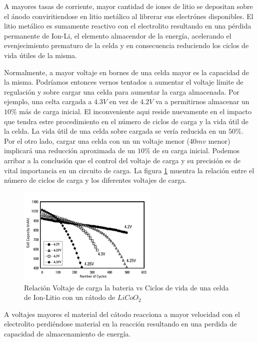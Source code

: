 \documentclass[10pt,a4paper]{article}
\begin{document}
A mayores tasas de corriente, mayor cantidad de iones de litio se depositan sobre
el ánodo conviritiendose en litio metálico al librerar sus electrónes disponibles.
El litio metálico es sumamente reactivo con el electrolito resultando en una
pérdida permanente de \acrshort{Ion-Li}, el elemento almacendor de la
energía, acelerando el evenjecimiento prematuro de
la celda y en consecuencia reduciendo los ciclos de vida útiles de la misma. 

Normalmente, a mayor voltaje en bornes de una celda mayor es la capacidad de la
misma. Podríamos entonces vernos tentados a aumentar el voltaje límite de
regulación y sobre cargar una celda para aumentar la carga almacenada. Por
ejemplo, una celta cargada a $4.3V$ en vez de $4.2V$ va a permitirnos almacenar
un $10\%$ más de carga inicial. El inconveniente aqui reside nuevamente en el
impacto que tendra estre procedimiento en el número de ciclos de carga y la vida
útil de la celda. La vida útil de una celda sobre cargada se vería reducida en un $50\%$.
Por el otro lado,
cargar una celda con un un voltaje menor ($40mv$ menor) implicará una reducción
aproximada de un $10\%$ de su carga inicial. Podemos arribar a la
conclusión que el control del voltaje de carga 
y su precisión es de vital importancia en un circuito de carga. La figura
\ref{fig:C_vs_Cycle_V} muentra la relación entre el número de ciclos de carga y
los diferentes voltajes de carga. 

\begin{figure}[h!]
     \centering
     \includegraphics[width=0.6\textwidth]{bat_char/C_vs_Cycle_V.png}
     \caption{Relación Voltaje de carga la bateria vs Ciclos de vida de una
	celda de Ion-Litio con un cátodo de $LiCoO_2$}
     \label{fig:C_vs_Cycle_V}
\end{figure}
\FloatBarrier

A voltajes mayores el material del cátodo reacciona a mayor velocidad con el
electrolito perdiéndose material en la reacción resultando en una perdida de
capacidad de almacenamiento de energía. 
\end{document}
